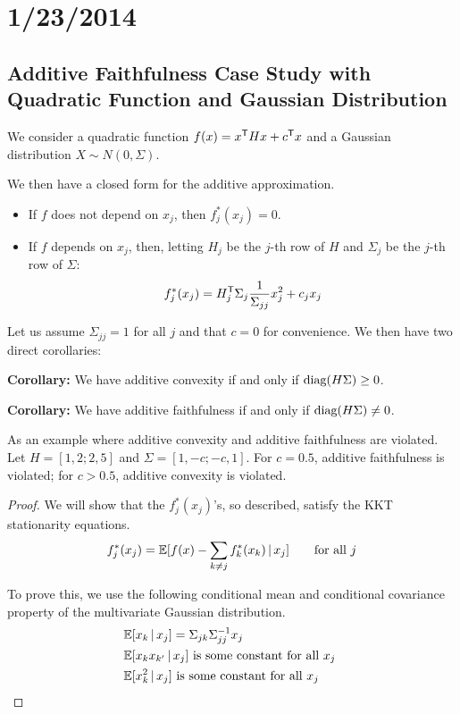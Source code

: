 \documentclass{article}
\begin{document}
\newpage

\section{1/23/2014}

\subsection{Additive Faithfulness Case Study with Quadratic Function and Gaussian Distribution}

We consider a quadratic function $f(x) = x^{\mathsf{T}} H x + c^{\mathsf{T}} x$ and a Gaussian distribution $X \sim N(0, \Sigma)$. 

We then have a closed form for the additive approximation.
\begin{itemize}
\item If $f$ does not depend on $x_j$, then $f^*_j(x_j) = 0$.
\item If $f$ depends on $x_j$, then, letting $H_j$ be the $j$-th row of $H$ and $\Sigma_j$ be the $j$-th row of $\Sigma$:
\[
f^*_j(x_j) = H_j^{\mathsf{T}} \Sigma_j \frac{1}{\Sigma_{jj}} x_j^2 + c_j x_j
\]

\end{itemize}

Let us assume $\Sigma_{jj} = 1$ for all $j$ and that $c=0$ for convenience. We then have two direct corollaries:

\textbf{Corollary:} We have additive convexity if and only if $\textrm{diag}(H \Sigma) \geq 0$.

\textbf{Corollary:} We have additive faithfulness if and only if $\textrm{diag}(H \Sigma) \neq 0$.

As an example where additive convexity and additive faithfulness are violated. Let $H = [1, 2; 2, 5]$ and $\Sigma = [1, -c; -c, 1]$. For $c=0.5$, additive faithfulness is violated; for $c > 0.5$, additive convexity is violated.


\begin{proof}
We will show that the $f^*_j(x_j)$'s, so described, satisfy the KKT stationarity equations.
\[
f^*_j(x_j) = \mathbb{E}[ f(x) - \sum_{k \neq j} f^*_k(x_k) \,|\, x_j ]  \qquad \textrm{for all } j
\]

To prove this, we use the following conditional mean and conditional covariance property of the multivariate Gaussian distribution.
\begin{align*}
& \mathbb{E}[ x_k \,|\, x_j ] = \Sigma_{jk} \Sigma_{jj}^{-1} x_j \\
& \mathbb{E}[ x_k x_{k'} \,|\, x_j] \textrm{ is some constant for all $x_j$ } \\
& \mathbb{E}[ x_k^2 \,|\, x_j ] \textrm{ is some constant for all $x_j$ } 
\end{align*}
\end{proof}
\end{document}

